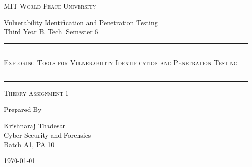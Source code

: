 \documentclass[11pt]{article}
\begin{document}
\begin{titlepage}
    \centering


    \huge\textsc{
        MIT World Peace University
    }\\

    \vspace{0.75\baselineskip} %

    \LARGE{
        Vulnerability Identification and Penetration Testing\\
        Third Year B. Tech, Semester 6
    }

    \vfill %


    \rule{\textwidth}{1.6pt}\vspace*{-\baselineskip}\vspace*{2pt}
    \rule{\textwidth}{0.6pt}
    \vspace{0.75\baselineskip} %



    \huge{\textsc{
            Exploring Tools for Vulnerability Identification and Penetration Testing
        }} \\



    \vspace{0.5\baselineskip} %
    \rule{\textwidth}{0.6pt}\vspace*{-\baselineskip}\vspace*{2.8pt}
    \rule{\textwidth}{1.6pt}

    \vspace{1\baselineskip} %


    \LARGE\textsc{
        Theory Assignment 1
    } %
    \vfill


    Prepared By
    \vspace{0.5\baselineskip} %

    \Large{
        Krishnaraj Thadesar \\
        Cyber Security and Forensics\\
        Batch A1, PA 10
    }


    \vspace{0.5\baselineskip} %
    \today

\end{titlepage}
\end{document}
